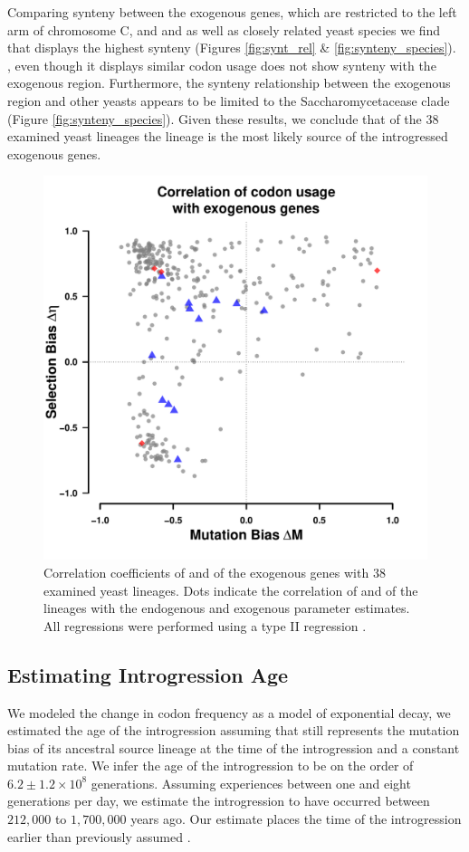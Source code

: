 \documentclass[fleqn,letterpaper]{article}
\begin{document}
Comparing synteny between the exogenous genes, which are restricted to the left arm of chromosome C, and \gossypii and \dubl as well as closely related yeast species we find that \gossypii displays the highest synteny (Figures \ref{fig:synt_rel} \& \ref{fig:synteny_species}).
\dubl, even though it displays similar codon usage does not show synteny with the exogenous region.
Furthermore, the synteny relationship between the exogenous region and other yeasts appears to be limited to the Saccharomycetacease clade (Figure \ref{fig:synteny_species}).
Given these results, we conclude that of the 38 examined yeast lineages the \gossypii lineage is the most likely source of the introgressed exogenous genes.

\begin{figure}
     \centering
	\includegraphics[width=.45\textwidth]{img/csp_mean_correlation_exo.pdf}
	\caption{Correlation coefficients of \DM and \DE of the exogenous genes with 38 examined yeast lineages. 
	Dots indicate the correlation of \DM and \DE of the lineages with the endogenous and exogenous parameter estimates. 
	All regressions were performed using a type II regression \citep{SokalAndRohlf1981}.}
	\label{fig:csp_exo_comp}
\end{figure}


\subsection*{Estimating Introgression Age}

We modeled the change in codon frequency as a model of exponential decay, we estimated the age of the introgression assuming that \gossypii still represents the mutation bias of its ancestral source lineage at the time of the introgression and a constant mutation rate.
We infer the age of the introgression to be on the order of $6.2\pm1.2\times 10^8$ generations. 
Assuming \kluyveri experiences between one and eight generations per day, we estimate the introgression to have occurred between $212,000$ to $1,700,000$ years ago.
Our estimate places the time of the introgression earlier than previously assumed \citep{friedrich2015}.
\end{document}

